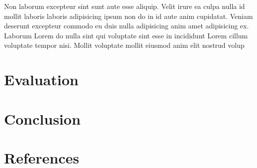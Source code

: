 \documentclass[12pt]{article}
\begin{document}


Non laborum excepteur sint sunt aute esse aliquip. Velit irure ea culpa nulla id mollit laboris laboris adipisicing ipsum non do in id aute anim cupidatat. Veniam deserunt excepteur commodo eu duis nulla adipisicing anim amet adipisicing ex. Laborum Lorem do nulla sint qui voluptate sint esse in incididunt Lorem cillum voluptate tempor nisi. Mollit voluptate mollit eiusmod anim elit nostrud volup

\section{Evaluation}

\section{Conclusion}

\section{References}
\end{document}

